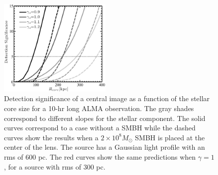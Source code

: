 \documentclass[chicago]{emulateapj}
\begin{document}
\begin{figure}
\begin{center}
\centering
\includegraphics[trim= 0 0 0 0, clip,width=0.48\textwidth]{figures/f_03.eps}
\centering
\end{center}
\caption{ Detection significance of a central image as a function of the stellar core size for a 10-hr long ALMA observation. The gray shades correspond to different slopes for the stellar component. The solid curves correspond to a case without a SMBH while the dashed curves show the results when a $2\times10^8M_{\odot}$ SMBH is placed at the center of the lens.
The source has a Gaussian light profile with an rms of 600 pc. The red curves show the same predictions when $\gamma=1$, for a source with rms of 300 pc.
\label{fig:3}}
\end{figure}
\end{document}
